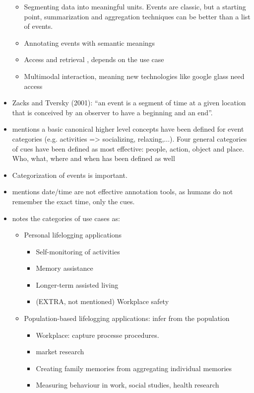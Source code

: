 \begin{itemize}
	\begin{itemize}
		\item Segmenting data into meaningful units. Events are classic, but a starting point, summarization and aggregation techniques can be better than a list of events.
		\item Annotating events with semantic meanings
		\item Access and retrieval , depends on the use case
		\item Multimodal interaction, meaning new technologies like google glass need access
	\end{itemize}
	\item Zacks and Tversky (2001): “an event is a segment of time at a given location that is conceived by
	an observer to have a beginning and an end”.
	\item \cite{gurrin2014lifelogging} mentions a basic canonical higher level concepts have been defined for event categories (e.g. activities => socializing, relaxing,...). Four general categories of cues have been defined as most effective: people, action, object and place. Who, what, where and when has been defined as well
	\item Categorization of events is important.
	\item \cite{gurrin2014lifelogging} mentions date/time are not effective annotation tools, as humans do not remember the exact time, only the cues.
	\item \cite{gurrin2014lifelogging} notes the categories of use cases as:
	\begin{itemize}
		\item Personal lifelogging applications
		\begin{itemize}
			\item Self-monitoring of activities
			\item Memory assistance
			\item Longer-term assisted living
			\item (EXTRA, not mentioned) Workplace safety
		\end{itemize}
		\item Population-based lifelogging applications: infer from the population
		\begin{itemize}
			\item Workplace: capture processe procedures.
			\item market research
			\item Creating family memories from aggregating individual memories
			\item Measuring behaviour in work, social studies, health research

\end{itemize}
\end{itemize}
\end{itemize}
